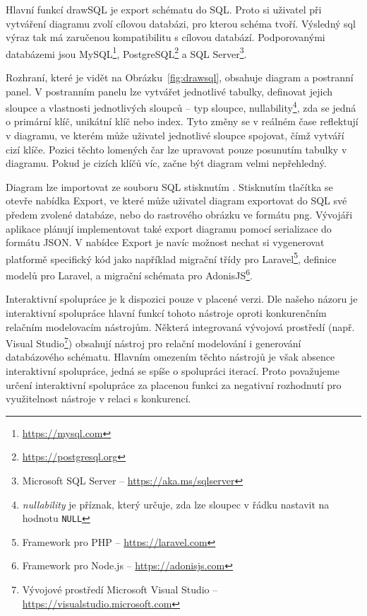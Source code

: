 Hlavní funkcí drawSQL je export schématu do SQL.
Proto si uživatel při vytváření diagramu zvolí cílovou databázi, pro kterou schéma tvoří.
Výsledný \acrshort{sql} výraz tak má zaručenou kompatibilitu s cílovou databází.
Podporovanými databázemi jsou
MySQL\footnote{\url{https://mysql.com}},
PostgreSQL\footnote{\url{https://postgresql.org}}
a SQL Server\footnote{Microsoft SQL Server -- \url{https://aka.ms/sqlserver}}.

Rozhraní, které je vidět na Obrázku~\ref{fig:drawsql}, obsahuje diagram a postranní panel.
V postranním panelu lze vytvářet jednotlivé tabulky, definovat jejich sloupce a vlastnosti jednotlivých sloupců -- typ sloupce,
nullability\footnote{\emph{nullability} je příznak, který určuje, zda lze sloupec v řádku nastavit na hodnotu \texttt{NULL}},
zda se jedná o primární klíč, unikátní klíč nebo index.
Tyto změny se v reálném čase reflektují v diagramu, ve kterém může uživatel jednotlivé sloupce spojovat, čímž vytváří cizí klíče.
Pozici těchto lomených čar lze upravovat pouze posunutím tabulky v diagramu.
Pokud je cizích klíčů víc, začne být diagram velmi nepřehledný.

Diagram lze importovat ze souboru SQL stisknutím .
Stisknutím tlačítka  se otevře nabídka Export, ve které může uživatel diagram exportovat do SQL své předem zvolené databáze, nebo do rastrového obrázku ve formátu \acrshort{png}.
Vývojáři aplikace plánují implementovat také export diagramu pomocí serializace do formátu JSON.
V nabídce Export je navíc možnost nechat si vygenerovat platformě specifický kód jako například migrační třídy pro
Laravel\footnote{Framework pro PHP -- \url{https://laravel.com}},
definice modelů pro Laravel, a migrační schémata pro
AdonisJS\footnote{Framework pro Node.js -- \url{https://adonisjs.com}}.

Interaktivní spolupráce je k dispozici pouze v placené verzi.
Dle našeho názoru je interaktivní spolupráce hlavní funkcí tohoto nástroje oproti konkurenčním relačním modelovacím nástrojům.
Některá integrovaná vývojová prostředí (např. Visual Studio\footnote{Vývojové prostředí Microsoft Visual Studio -- \url{https://visualstudio.microsoft.com}}) obsahují nástroj pro relační modelování i generování databázového schématu.
Hlavním omezením těchto nástrojů je však absence interaktivní spolupráce, jedná se spíše o spolupráci iterací.
Proto považujeme určení interaktivní spolupráce za placenou funkci za negativní rozhodnutí pro využitelnost nástroje v relaci s konkurencí.

